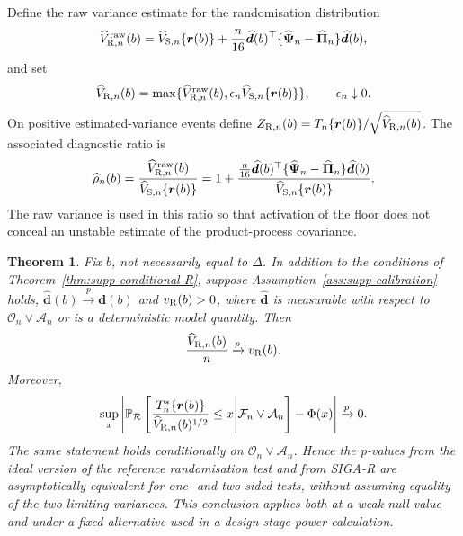 \documentclass[12pt,a4paper]{article}
\newtheorem{theorem}{Theorem}
\theoremstyle{definition}
\theoremstyle{remark}\newtheorem{remark}{Remark}
\numberwithin{equation}{section}
\newcommand{\Pbb}{\mathbb P}
\newcommand{\Rcal}{\mathcal R}
\begin{document}
Define the raw variance estimate for the randomisation distribution
\begin{equation}\label{eq:supp-VRraw}
\widehat V_{{\rm R},n}^{\rm raw}(b)
=\widehat V_{{\rm S},n}\{\bm r(b)\}
+\frac n{16}\widehat{\bm d}(b)^\top
\{\widehat{\bm\Psi}_n-\widehat{\bm\Pi}_n\}
\widehat{\bm d}(b),
\end{equation}
and set
\[
\widehat V_{{\rm R},n}(b)
=\max\{\widehat V_{{\rm R},n}^{\rm raw}(b),
        \epsilon_n\widehat V_{{\rm S},n}\{\bm r(b)\}\},
\qquad \epsilon_n\downarrow0.
\]
On positive estimated-variance events define $Z_{{\rm R},n}(b)=T_n\{\bm r(b)\}/\sqrt{\widehat V_{{\rm R},n}(b)}$. The associated diagnostic ratio is
\begin{equation}\label{eq:supp-rho}
\widehat\rho_n(b)
=
\frac{\widehat V_{{\rm R},n}^{\rm raw}(b)}
{\widehat V_{{\rm S},n}\{\bm r(b)\}}
=
1+
\frac{
\frac n{16}\widehat{\bm d}(b)^\top
\{\widehat{\bm\Psi}_n-\widehat{\bm\Pi}_n\}
\widehat{\bm d}(b)
}{
\widehat V_{{\rm S},n}\{\bm r(b)\}
}.
\end{equation}
The raw variance is used in this ratio so that activation of the floor does not conceal an unstable estimate of the product-process covariance.

\begin{theorem}\label{thm:supp-SIGA-R}
Fix $b$, not necessarily equal to $\Delta$. In addition to the conditions of Theorem~\ref{thm:supp-conditional-R}, suppose Assumption~\ref{ass:supp-calibration} holds, $\widehat{\bm d}(b)\xrightarrow{p}\bm d(b)$ and $v_{\rm R}(b)>0$, where $\widehat{\bm d}$ is measurable with respect to $\mathcal O_n\vee\mathcal A_n$ or is a deterministic model quantity. Then
\[
\frac{\widehat V_{{\rm R},n}(b)}n
\xrightarrow{p} v_{\rm R}(b).
\]
Moreover,
\[
\sup_x\left|
\Pbb_{\Rcal}\left[
\frac{T_n^*\{\bm r(b)\}}
{\widehat V_{{\rm R},n}(b)^{1/2}}
\le x\middle|\mathcal F_n\vee\mathcal A_n
\right]-\Phi(x)
\right|
\xrightarrow{p}0.
\]
The same statement holds conditionally on $\mathcal O_n\vee\mathcal A_n$. Hence the p-values from the ideal version of the reference randomisation test and from SIGA-R are asymptotically equivalent for one- and two-sided tests, without assuming equality of the two limiting variances. This conclusion applies both at a weak-null value and under a fixed alternative used in a design-stage power calculation.
\end{theorem}
\end{document}
